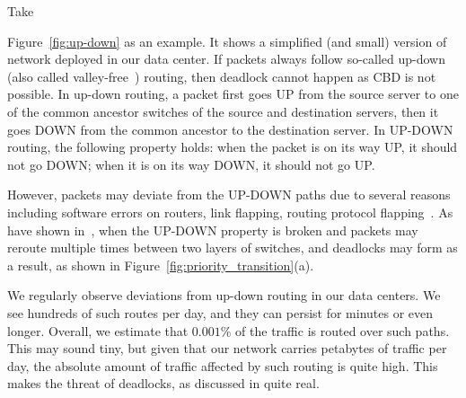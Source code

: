 Take {Figure~\ref{fig:up-down} as an example. It shows a simplified (and small) version of
network deployed in our data center. If packets always follow so-called
up-down (also called valley-free~\cite{qiu2007toward}) routing, then deadlock
cannot happen as CBD is not possible. In up-down routing, a packet first goes UP
from the source server to one of the common ancestor switches of the source and
destination servers, then it goes DOWN from the common ancestor to the
destination server.  In UP-DOWN routing, the following property holds: when the
packet is on its way UP, it should not go DOWN; when it is on its way DOWN, it
should not go UP.


However, packets may deviate from the UP-DOWN paths due to several reasons
including software errors on routers, link flapping, routing protocol
flapping~\cite{f10}. As have shown in~\cite{shpiner2016unlocking}, when the
UP-DOWN property is broken and packets may reroute multiple times between two
layers of switches, and deadlocks may form as a result, as shown in
Figure~\ref{fig:priority_transition}(a).

We regularly observe deviations from up-down routing in our data centers.  We
see hundreds of such routes per day, and they can persist for minutes or even
longer. Overall, we estimate that $0.001\%$ of the traffic is routed over such
paths. This may sound tiny, but given that our network carries petabytes of
traffic per day, the absolute amount of traffic affected by such routing is
quite high. This makes the threat of deadlocks, as discussed
in\cite{rdmaatscale,shpiner2016unlocking,hu2016deadlocks} quite real.

}
